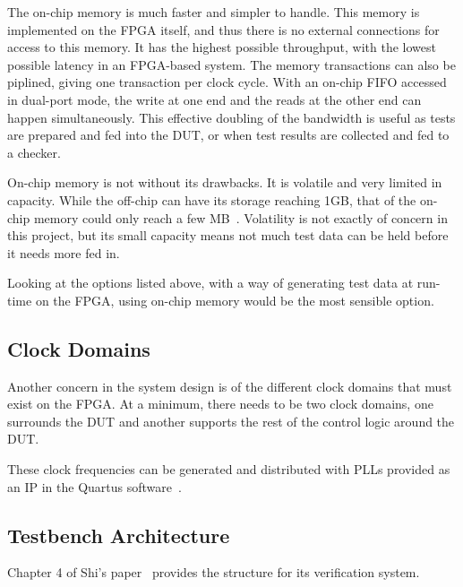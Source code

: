 The on-chip memory is much faster and simpler to handle.
This memory is implemented on the FPGA itself, and thus there is no external
connections for access to this memory.
It has the highest possible throughput, with the lowest possible latency
in an FPGA-based system.
The memory transactions can also be piplined, giving one transaction per
clock cycle.
With an on-chip FIFO accessed in dual-port mode, the write at one end and the
reads at the other end can happen simultaneously.
This effective doubling of the bandwidth is useful as tests are prepared
and fed into the DUT, or when test results are collected and fed to a checker.

On-chip memory is not without its drawbacks.
It is volatile and very limited in capacity.
While the off-chip can have its storage reaching 1GB, that of the on-chip
memory could only reach a few MB~\cite{Altera2}.
Volatility is not exactly of concern in this project, but its small capacity
means not much test data can be held before it needs more fed in.

Looking at the options listed above, with a way of generating test data at
run-time on the FPGA, using on-chip memory would be the most sensible option.

\subsection{Clock Domains}
Another concern in the system design is of the different clock domains that
must exist on the FPGA.
At a minimum, there needs to be two clock domains, one surrounds the DUT and
another supports the rest of the control logic around the DUT.

These clock frequencies can be generated and distributed with PLLs provided as
an IP in the Quartus software~\cite{Altera4}.

\subsection{Testbench Architecture}

Chapter 4 of Shi's paper~\cite{Shi1} provides the structure for its
verification system.